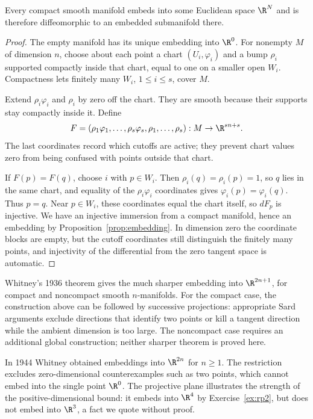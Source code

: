 \begin{theorem}\label{thm:whitney}
Every compact smooth manifold embeds into some Euclidean space $\R^N$ and is therefore diffeomorphic to an embedded submanifold there.
\end{theorem}
\begin{proof}
The empty manifold has its unique embedding into $\R^0$. For nonempty $M$ of dimension $n$, choose about each point a chart $(U_i,\varphi_i)$ and a bump $\rho_i$ supported compactly inside that chart, equal to one on a smaller open $W_i$. Compactness lets finitely many $W_i$, $1\le i\le s$, cover $M$.

Extend $\rho_i\varphi_i$ and $\rho_i$ by zero off the chart. They are smooth because their supports stay compactly inside it. Define
\[
F=(\rho_1\varphi_1,\ldots,\rho_s\varphi_s,\rho_1,\ldots,\rho_s)
:M\to\R^{sn+s}.
\]
The last coordinates record which cutoffs are active; they prevent chart values zero from being confused with points outside that chart.

If $F(p)=F(q)$, choose $i$ with $p\in W_i$. Then $\rho_i(q)=\rho_i(p)=1$, so $q$ lies in the same chart, and equality of the $\rho_i\varphi_i$ coordinates gives $\varphi_i(p)=\varphi_i(q)$. Thus $p=q$. Near $p\in W_i$, these coordinates equal the chart itself, so $dF_p$ is injective. We have an injective immersion from a compact manifold, hence an embedding by Proposition~\ref{prop:embedding}. In dimension zero the coordinate blocks are empty, but the cutoff coordinates still distinguish the finitely many points, and injectivity of the differential from the zero tangent space is automatic.
\end{proof}

\begin{remark}
Whitney's 1936 theorem gives the much sharper embedding into $\R^{2n+1}$, for compact and noncompact smooth $n$-manifolds. For the compact case, the construction above can be followed by successive projections: appropriate Sard arguments exclude directions that identify two points or kill a tangent direction while the ambient dimension is too large. The noncompact case requires an additional global construction; neither sharper theorem is proved here.

In 1944 Whitney obtained embeddings into $\R^{2n}$ for $n\ge1$. The restriction excludes zero-dimensional counterexamples such as two points, which cannot embed into the single point $\R^0$. The projective plane illustrates the strength of the positive-dimensional bound: it embeds into $\R^4$ by Exercise~\ref{ex:rp2}, but does not embed into $\R^3$, a fact we quote without proof.
\end{remark}

